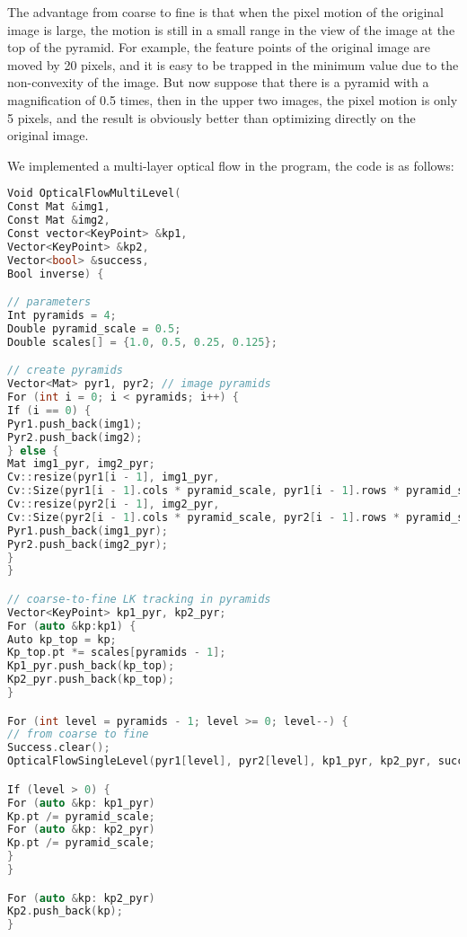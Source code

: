 The advantage from coarse to fine is that when the pixel motion of the original image is large, the motion is still in a small range in the view of the image at the top of the pyramid. For example, the feature points of the original image are moved by 20 pixels, and it is easy to be trapped in the minimum value due to the non-convexity of the image. But now suppose that there is a pyramid with a magnification of 0.5 times, then in the upper two images, the pixel motion is only 5 pixels, and the result is obviously better than optimizing directly on the original image.

We implemented a multi-layer optical flow in the program, the code is as follows:
\begin{lstlisting}[language=c++,caption=slambook2/ch8/optical_flow.cpp(fragment)]
Void OpticalFlowMultiLevel(
Const Mat &img1,
Const Mat &img2,
Const vector<KeyPoint> &kp1,
Vector<KeyPoint> &kp2,
Vector<bool> &success,
Bool inverse) {

// parameters
Int pyramids = 4;
Double pyramid_scale = 0.5;
Double scales[] = {1.0, 0.5, 0.25, 0.125};

// create pyramids
Vector<Mat> pyr1, pyr2; // image pyramids
For (int i = 0; i < pyramids; i++) {
If (i == 0) {
Pyr1.push_back(img1);
Pyr2.push_back(img2);
} else {
Mat img1_pyr, img2_pyr;
Cv::resize(pyr1[i - 1], img1_pyr,
Cv::Size(pyr1[i - 1].cols * pyramid_scale, pyr1[i - 1].rows * pyramid_scale));
Cv::resize(pyr2[i - 1], img2_pyr,
Cv::Size(pyr2[i - 1].cols * pyramid_scale, pyr2[i - 1].rows * pyramid_scale));
Pyr1.push_back(img1_pyr);
Pyr2.push_back(img2_pyr);
}
}

// coarse-to-fine LK tracking in pyramids
Vector<KeyPoint> kp1_pyr, kp2_pyr;
For (auto &kp:kp1) {
Auto kp_top = kp;
Kp_top.pt *= scales[pyramids - 1];
Kp1_pyr.push_back(kp_top);
Kp2_pyr.push_back(kp_top);
}

For (int level = pyramids - 1; level >= 0; level--) {
// from coarse to fine
Success.clear();
OpticalFlowSingleLevel(pyr1[level], pyr2[level], kp1_pyr, kp2_pyr, success, inverse, true);

If (level > 0) {
For (auto &kp: kp1_pyr)
Kp.pt /= pyramid_scale;
For (auto &kp: kp2_pyr)
Kp.pt /= pyramid_scale;
}
}

For (auto &kp: kp2_pyr)
Kp2.push_back(kp);
}
\end{lstlisting}

